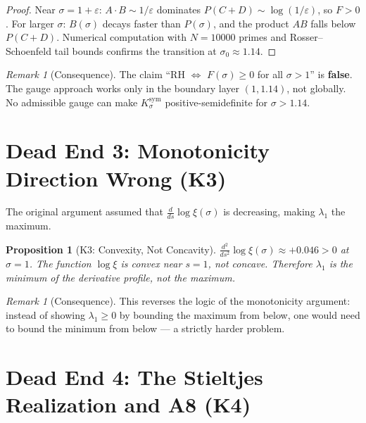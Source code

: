 \documentclass[12pt,a4paper]{article}
\newtheorem{proposition}[theorem]{Proposition}
\theoremstyle{definition}
\theoremstyle{remark}
\newtheorem{remark}[theorem]{Remark}
\newcommand{\Ksym}{K_\sigma^{\mathrm{sym}}}
\begin{document}
\begin{proof}
Near $\sigma = 1 + \varepsilon$: $A \cdot B \sim 1/\varepsilon$ dominates $P(C+D) \sim \log(1/\varepsilon)$, so $F > 0$. For larger $\sigma$: $B(\sigma)$ decays faster than $P(\sigma)$, and the product $AB$ falls below $P(C+D)$. Numerical computation with $N = 10000$ primes and Rosser--Schoenfeld tail bounds confirms the transition at $\sigma_0 \approx 1.14$.
\end{proof}

\begin{remark}[Consequence]
The claim ``RH $\Leftrightarrow$ $F(\sigma) \geq 0$ for all $\sigma > 1$'' is \textbf{false}. The gauge approach works only in the boundary layer $(1, 1.14)$, not globally. No admissible gauge can make $\Ksym$ positive-semidefinite for $\sigma > 1.14$.
\end{remark}


\section{Dead End 3: Monotonicity Direction Wrong (K3)}
\label{sec:K3}

The original argument assumed that $\frac{d}{ds}\log\xi(\sigma)$ is decreasing, making $\lambda_1$ the maximum.

\begin{proposition}[K3: Convexity, Not Concavity]
\label{prop:K3}
$\frac{d^2}{ds^2}\log\xi(\sigma) \approx +0.046 > 0$ at $\sigma = 1$. The function $\log\xi$ is \emph{convex} near $s = 1$, not concave. Therefore $\lambda_1$ is the \emph{minimum} of the derivative profile, not the maximum.
\end{proposition}

\begin{remark}[Consequence]
This reverses the logic of the monotonicity argument: instead of showing $\lambda_1 \geq 0$ by bounding the maximum from below, one would need to bound the minimum from below --- a strictly harder problem.
\end{remark}


\section{Dead End 4: The Stieltjes Realization and A8 (K4)}
\label{sec:K4}
\end{document}
